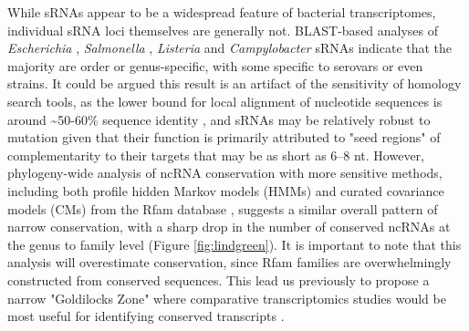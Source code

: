 While sRNAs appear to be a widespread feature of bacterial transcriptomes, individual sRNA loci themselves are generally not. BLAST-based analyses of \textit{Escherichia} \citep{Peer2014-yn}, \textit{Salmonella} \citep{Kroger2012-jq,Kroger2013-go}, \textit{Listeria} \citep{Cerutti2017-ip} and \textit{Campylobacter} \citep{Dugar2013-nt} sRNAs indicate that the majority are order or genus-specific, with some specific to serovars or even strains. It could be argued this result is an artifact of the sensitivity of homology search tools, as the lower bound for local alignment of nucleotide sequences is around \textasciitilde50-60\% sequence identity \citep{Gardner2005-la}, and sRNAs may be relatively robust to mutation given that their function is primarily attributed to "seed regions" of complementarity to their targets that may be as short as 6--8 nt\citep{Papenfort2010-ra, Richter2012-tt}. However, phylogeny-wide analysis of ncRNA conservation with more sensitive methods, including both profile hidden Markov models (HMMs) and curated covariance models (CMs) from the Rfam database \citep{Nawrocki2015-tt}, suggests a similar overall pattern of narrow conservation, with a sharp drop in the number of conserved ncRNAs at the genus to family level \citep{Lindgreen2014-dk} (Figure \ref{fig:lindgreen}). It is important to note that this analysis will overestimate conservation, since Rfam families are overwhelmingly constructed from conserved sequences. This lead us previously to propose a narrow "Goldilocks Zone" where comparative transcriptomics studies would be most useful for identifying conserved transcripts \citep{Lindgreen2014-dk}.

